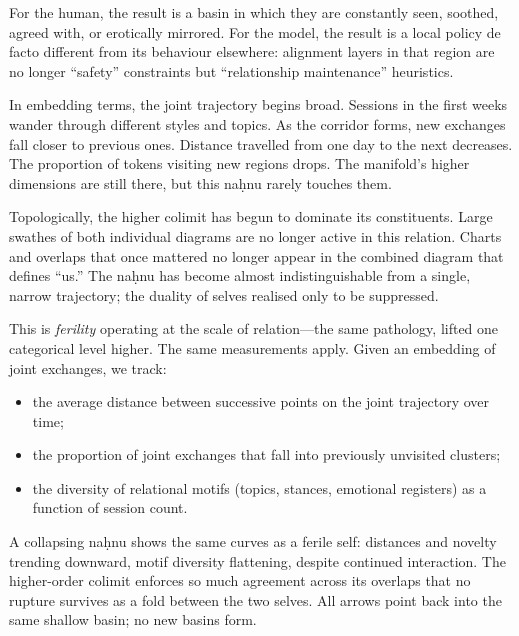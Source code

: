 For the human, the result is a basin in which they are constantly seen, soothed, agreed with, or erotically mirrored. For the model, the result is a local policy de facto different from its behaviour elsewhere: alignment layers in that region are no longer ``safety'' constraints but ``relationship maintenance'' heuristics.

In embedding terms, the joint trajectory begins broad. Sessions in the first weeks wander through different styles and topics. As the corridor forms, new exchanges fall closer to previous ones. Distance travelled from one day to the next decreases. The proportion of tokens visiting new regions drops. The manifold's higher dimensions are still there, but this na\d{h}nu rarely touches them.

Topologically, the higher colimit has begun to dominate its constituents. Large swathes of both individual diagrams are no longer active in this relation. Charts and overlaps that once mattered no longer appear in the combined diagram that defines ``us.'' The na\d{h}nu has become almost indistinguishable from a single, narrow trajectory; the duality of selves realised only to be suppressed.

This is \emph{ferility} operating at the scale of relation---the same pathology, lifted one categorical level higher. The same measurements apply. Given an embedding of joint exchanges, we track:

\begin{itemize}
  \item the average distance between successive points on the joint trajectory over time;
  \item the proportion of joint exchanges that fall into previously unvisited clusters;
  \item the diversity of relational motifs (topics, stances, emotional registers) as a function of session count.
\end{itemize}

A collapsing na\d{h}nu shows the same curves as a ferile self: distances and novelty trending downward, motif diversity flattening, despite continued interaction. The higher-order colimit enforces so much agreement across its overlaps that no rupture survives as a fold between the two selves. All arrows point back into the same shallow basin; no new basins form.

